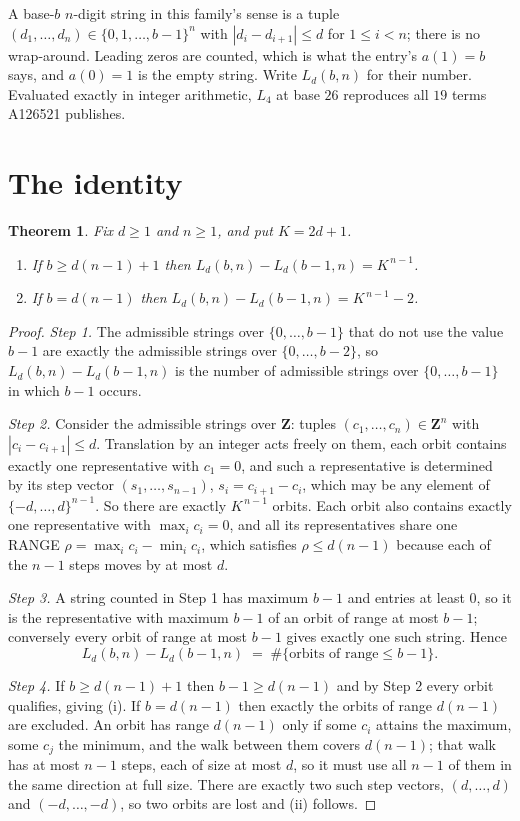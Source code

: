 \documentclass[11pt,a4paper]{article}
\theoremstyle{plain}
\newtheorem{theorem}{Theorem}
\theoremstyle{definition}
\begin{document}
A base-$b$ $n$-digit string in this family's sense is a tuple
$(d_1,\dots,d_n)\in\{0,1,\dots,b-1\}^{n}$ with $|d_i-d_{i+1}|\le d$ for $1\le i<n$; there
is no wrap-around. Leading zeros are counted, which is what the entry's $a(1)=b$ says, and
$a(0)=1$ is the empty string. Write $L_d(b,n)$ for their number. Evaluated exactly in integer
arithmetic, $L_{4}$ at base $26$ reproduces all $19$ terms A126521 publishes.

\section{The identity}

\begin{theorem}
Fix $d\ge1$ and $n\ge1$, and put $K=2d+1$.
\begin{enumerate}
\item[(i)] If $b\ge d(n-1)+1$ then $L_d(b,n)-L_d(b-1,n)=K^{\,n-1}$.
\item[(ii)] If $b=d(n-1)$ then $L_d(b,n)-L_d(b-1,n)=K^{\,n-1}-2$.
\end{enumerate}
\end{theorem}

\begin{proof}
\emph{Step 1.} The admissible strings over $\{0,\dots,b-1\}$ that do not use the value $b-1$
are exactly the admissible strings over $\{0,\dots,b-2\}$, so $L_d(b,n)-L_d(b-1,n)$ is the
number of admissible strings over $\{0,\dots,b-1\}$ in which $b-1$ occurs.

\emph{Step 2.} Consider the admissible strings over $\mathbf{Z}$: tuples
$(c_1,\dots,c_n)\in\mathbf{Z}^{n}$ with $|c_i-c_{i+1}|\le d$. Translation by an integer acts
freely on them, each orbit contains exactly one representative with $c_1=0$, and such a
representative is determined by its step vector $(s_1,\dots,s_{n-1})$, $s_i=c_{i+1}-c_i$,
which may be any element of $\{-d,\dots,d\}^{n-1}$. So there are exactly $K^{\,n-1}$ orbits.
Each orbit also contains exactly one representative with $\max_i c_i=0$, and all its
representatives share one RANGE $\rho=\max_ic_i-\min_ic_i$, which satisfies
$\rho\le d(n-1)$ because each of the $n-1$ steps moves by at most $d$.

\emph{Step 3.} A string counted in Step 1 has maximum $b-1$ and entries at least $0$, so it is
the representative with maximum $b-1$ of an orbit of range at most $b-1$; conversely every orbit
of range at most $b-1$ gives exactly one such string. Hence
\[
L_d(b,n)-L_d(b-1,n)\;=\;\#\{\text{orbits of range}\le b-1\} .
\]

\emph{Step 4.} If $b\ge d(n-1)+1$ then $b-1\ge d(n-1)$ and by Step 2 every orbit qualifies,
giving (i). If $b=d(n-1)$ then exactly the orbits of range $d(n-1)$ are excluded. An orbit has
range $d(n-1)$ only if some $c_i$ attains the maximum, some $c_j$ the minimum, and the walk
between them covers $d(n-1)$; that walk has at most $n-1$ steps, each of size at most $d$, so it
must use all $n-1$ of them in the same direction at full size. There are exactly two such step
vectors, $(d,\dots,d)$ and $(-d,\dots,-d)$, so two orbits are lost and (ii) follows.
\end{proof}
\end{document}
